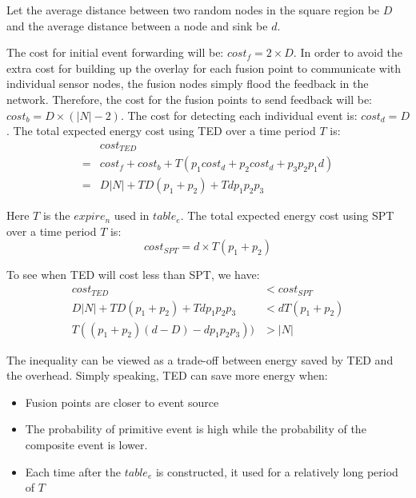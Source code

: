 Let the average distance between two random nodes in the square region be \(D\) and the average distance between a node and sink be \(d\). 
\begin{comment}
Then:
\begin{equation*}
D=\frac{2+\sqrt{2}+5\times ln(1+\sqrt{}2)}{15}\times|N|
\end{equation*}
Let the average distance between the event source and the event fusion points be \(d\).
\end{comment}

The cost for initial event forwarding will be: \(cost_f=2\times D\). In order to avoid the extra cost for building up the overlay for each fusion point to communicate with individual sensor nodes, the fusion nodes simply flood the feedback in the network. Therefore, the cost for the fusion points to send feedback will be: \(cost_b=D\times(|N|-2)\). The cost for detecting each individual event is: \(cost_d=D\). The total expected energy cost using TED over a time period \(T\) is:
\begin{align*}
&cost_{TED}\\
=&cost_f+cost_b+T(p_1cost_d+p_2cost_d+p_3p_2p_1d)\\
=&D|N|+TD(p_1+p_2)+Tdp_1p_2p_3
\end{align*}

Here \(T\) is the \(expire_n\) used in \(table_e\). The total expected energy cost using SPT over a time period \(T\) is:
\begin{equation*}
cost_{SPT}=d\times T(p_1+p_2)
\end{equation*}

To see when TED will cost less than SPT, we have:
\begin{align*}
cost_{TED}&<cost_{SPT}\\
D|N|+TD(p_1+p_2)+Tdp_1p_2p_3&<dT(p_1+p_2)\\
T((p_1+p_2)(d-D)-dp_1p_2p_3))&>|N|
\end{align*}

The inequality can be viewed as a trade-off between energy saved by TED and the overhead. Simply speaking, TED can save more energy when:
\begin{itemize}
\item Fusion points are closer to event source
\item The probability of primitive event is high while the probability of the composite event is lower.
\item Each time after the \(table_e\) is constructed, it used for a relatively long period of \(T\) 
\end{itemize}

